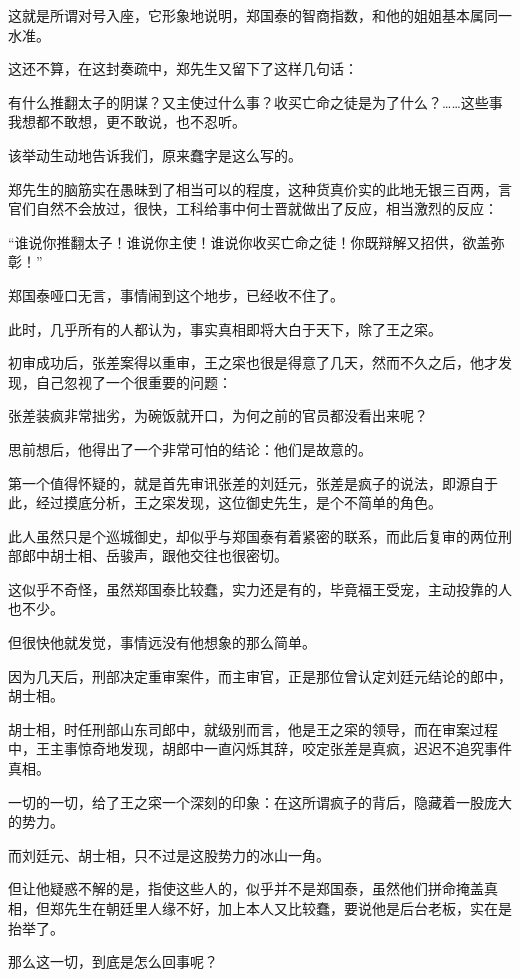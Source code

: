 \begin{multicols}{\theparacolNo}
这就是所谓对号入座，它形象地说明，郑国泰的智商指数，和他的姐姐基本属同一水准。

这还不算，在这封奏疏中，郑先生又留下了这样几句话：

有什么推翻太子的阴谋？又主使过什么事？收买亡命之徒是为了什么？……这些事我想都不敢想，更不敢说，也不忍听。

该举动生动地告诉我们，原来蠢字是这么写的。

郑先生的脑筋实在愚昧到了相当可以的程度，这种货真价实的此地无银三百两，言官们自然不会放过，很快，工科给事中何士晋就做出了反应，相当激烈的反应：

“谁说你推翻太子！谁说你主使！谁说你收买亡命之徒！你既辩解又招供，欲盖弥彰！”

郑国泰哑口无言，事情闹到这个地步，已经收不住了。

此时，几乎所有的人都认为，事实真相即将大白于天下，除了王之寀。

初审成功后，张差案得以重审，王之寀也很是得意了几天，然而不久之后，他才发现，自己忽视了一个很重要的问题：

张差装疯非常拙劣，为碗饭就开口，为何之前的官员都没看出来呢？

思前想后，他得出了一个非常可怕的结论：他们是故意的。

第一个值得怀疑的，就是首先审讯张差的刘廷元，张差是疯子的说法，即源自于此，经过摸底分析，王之寀发现，这位御史先生，是个不简单的角色。

此人虽然只是个巡城御史，却似乎与郑国泰有着紧密的联系，而此后复审的两位刑部郎中胡士相、岳骏声，跟他交往也很密切。

这似乎不奇怪，虽然郑国泰比较蠢，实力还是有的，毕竟福王受宠，主动投靠的人也不少。

但很快他就发觉，事情远没有他想象的那么简单。

因为几天后，刑部决定重审案件，而主审官，正是那位曾认定刘廷元结论的郎中，胡士相。

胡士相，时任刑部山东司郎中，就级别而言，他是王之寀的领导，而在审案过程中，王主事惊奇地发现，胡郎中一直闪烁其辞，咬定张差是真疯，迟迟不追究事件真相。

一切的一切，给了王之寀一个深刻的印象：在这所谓疯子的背后，隐藏着一股庞大的势力。

而刘廷元、胡士相，只不过是这股势力的冰山一角。

但让他疑惑不解的是，指使这些人的，似乎并不是郑国泰，虽然他们拼命掩盖真相，但郑先生在朝廷里人缘不好，加上本人又比较蠢，要说他是后台老板，实在是抬举了。

那么这一切，到底是怎么回事呢？


\end{multicols}
